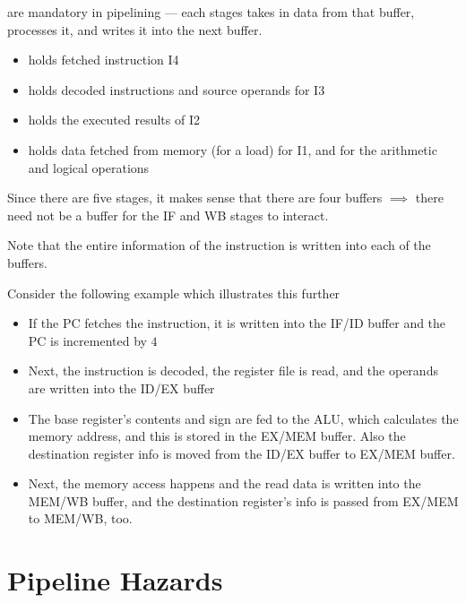 \documentclass[12pt]{scrartcl}
\begin{document}
\begin{definition}
   are mandatory in pipelining --- each stages takes in data from that buffer, 
  processes it, and writes it into the next buffer. 
  \begin{itemize}
    \item {} holds fetched instruction I4
    \item {} holds decoded instructions and source operands for I3
    \item {} holds the executed results of I2
    \item {} holds data fetched from memory (for a load) for I1, and for the arithmetic and logical operations 
  \end{itemize}
  Since there are five stages, it makes sense that there are four buffers $\implies$ there need not be a buffer for the IF and WB stages to interact.
\end{definition}

\begin{note}
  Note that the entire information of the instruction is written into each of the buffers.
  \begin{example}
    Consider the following example which illustrates this further
    \begin{itemize}
      \item If the PC fetches the instruction, it is written into the IF/ID buffer and the PC is incremented by $4$
      \item Next, the instruction is decoded, the register file is read, and the operands are written into the ID/EX buffer
      \item The base register's contents and sign are fed to the ALU, which calculates the memory address, and this is stored in the EX/MEM buffer. Also
      the destination register info is moved from the ID/EX buffer to EX/MEM buffer. 
      \item Next, the memory access happens and the read data is written into the MEM/WB buffer, and the destination register's info is passed from EX/MEM to MEM/WB, too. 
    \end{itemize}
  \end{example}
\end{note}

\section{Pipeline Hazards}
\end{document}
